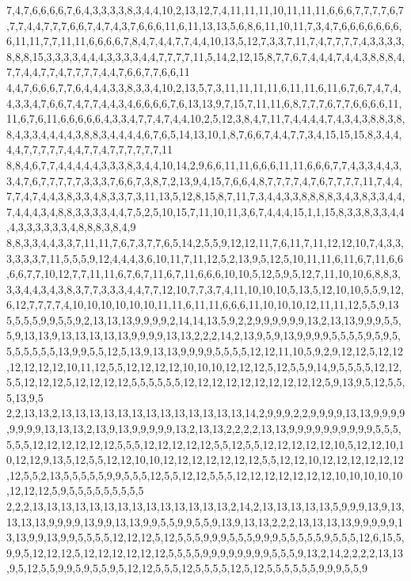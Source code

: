7,4,7,6,6,6,6,7,6,4,3,3,3,3,8,3,4,4,10,2,13,12,7,4,11,11,11,10,11,11,11,6,6,6,7,7,7,7,6,7,7,7,4,4,7,7,7,6,6,7,4,7,4,3,7,6,6,6,11,6,11,13,13,5,6,8,6,11,10,11,7,3,4,7,6,6,6,6,6,6,6,6,11,11,7,7,11,11,6,6,6,6,7,8,4,7,4,4,7,7,4,4,10,13,5,12,7,3,3,7,11,7,4,7,7,7,7,4,3,3,3,3,8,8,8,15,3,3,3,3,4,4,4,3,3,3,3,4,4,7,7,7,7,11,5,14,2,12,15,8,7,7,6,7,4,4,4,7,4,4,3,8,8,8,4,7,7,4,4,7,7,4,7,7,7,7,4,4,7,6,6,7,7,6,6,11
4,4,7,6,6,6,7,7,6,4,4,4,3,3,8,3,3,4,10,2,13,5,7,3,11,11,11,11,6,11,11,6,11,6,7,6,7,4,7,4,4,3,3,4,7,6,6,7,4,7,7,4,4,3,4,6,6,6,6,7,6,13,13,9,7,15,7,11,11,6,8,7,7,7,6,7,7,6,6,6,6,11,11,6,7,6,11,6,6,6,6,6,4,3,3,4,7,7,4,7,4,4,10,2,5,12,3,8,4,7,11,7,4,4,4,4,7,4,3,4,3,8,8,3,8,8,4,3,3,4,4,4,4,3,8,8,3,4,4,4,4,6,7,6,5,14,13,10,1,8,7,6,6,7,4,4,7,7,3,4,15,15,15,8,3,4,4,4,4,7,7,7,7,7,4,4,7,7,4,7,7,7,7,7,7,11
8,8,4,6,7,7,4,4,4,4,4,3,3,3,8,3,4,4,10,14,2,9,6,6,11,11,6,6,6,11,11,6,6,6,7,7,4,3,3,4,4,3,3,4,7,6,7,7,7,7,7,3,3,3,7,6,6,7,3,8,7,2,13,9,4,15,7,6,6,4,8,7,7,7,7,4,7,6,7,7,7,7,11,7,4,4,7,7,4,7,4,4,3,8,3,3,4,8,3,3,7,3,11,13,5,12,8,15,8,7,11,7,3,4,4,3,3,8,8,8,8,3,4,3,8,3,3,4,4,7,4,4,4,3,4,8,8,3,3,3,3,4,4,7,5,2,5,10,15,7,11,10,11,3,6,7,4,4,4,15,1,1,15,8,3,3,8,3,3,4,4,4,3,3,3,3,3,3,4,8,8,8,3,8,4,9
8,8,3,3,4,4,3,3,7,11,11,7,6,7,3,7,7,6,5,14,2,5,5,9,12,12,11,7,6,11,7,11,12,12,10,7,4,3,3,3,3,3,3,7,11,5,5,5,9,12,4,4,4,3,6,10,11,7,11,12,5,2,13,9,5,12,5,10,11,11,6,11,6,7,11,6,6,6,6,7,7,10,12,7,7,11,11,6,7,6,7,11,6,7,11,6,6,6,10,10,5,12,5,9,5,12,7,11,10,10,6,8,8,3,3,3,4,4,3,4,3,8,3,7,7,3,3,3,4,4,7,7,12,10,7,7,3,7,4,11,10,10,10,5,13,5,12,10,10,5,5,9,12,6,12,7,7,7,7,4,10,10,10,10,10,10,11,11,6,11,11,6,6,6,11,10,10,10,12,11,11,12,5,5,9,13
5,5,5,5,9,9,5,5,9,2,13,13,13,9,9,9,9,2,14,14,13,5,9,2,2,9,9,9,9,9,9,13,2,13,13,9,9,9,5,5,5,9,13,13,9,13,13,13,13,13,9,9,9,9,13,13,2,2,2,14,2,13,9,5,9,13,9,9,9,9,5,5,5,5,9,5,9,5,5,5,5,5,5,5,13,9,9,5,5,12,5,13,9,13,13,9,9,9,9,5,5,5,5,12,12,11,10,5,9,2,9,12,12,5,12,12,12,12,12,12,10,11,12,5,5,12,12,12,12,10,10,10,12,12,12,5,12,5,5,9,14,9,5,5,5,5,12,12,5,5,12,12,12,5,12,12,12,12,5,5,5,5,5,5,12,12,12,12,12,12,12,12,12,12,5,9,13,9,5,12,5,5,5,13,9,5
2,2,13,13,2,13,13,13,13,13,13,13,13,13,13,13,13,13,14,2,9,9,9,2,2,9,9,9,9,13,13,9,9,9,9,9,9,9,9,13,13,13,2,13,9,13,9,9,9,9,9,13,2,13,13,2,2,2,2,13,13,9,9,9,9,9,9,9,9,9,9,5,5,5,5,5,5,12,12,12,12,12,12,5,5,5,12,12,12,12,12,5,5,12,5,5,12,12,12,12,12,10,5,12,12,10,10,12,12,9,13,5,12,5,5,12,12,10,10,12,12,12,12,12,12,12,5,5,12,12,10,12,12,12,12,12,12,12,5,5,2,13,5,5,5,5,5,9,9,5,5,5,12,5,5,12,12,5,5,5,12,12,12,12,12,12,12,10,10,10,10,10,12,12,12,5,9,5,5,5,5,5,5,5,5,5
2,2,2,13,13,13,13,13,13,13,13,13,13,13,13,13,13,2,14,2,13,13,13,13,13,5,9,9,9,13,9,13,13,13,13,9,9,9,9,13,9,9,13,13,9,9,5,5,9,9,5,5,9,13,9,13,13,2,2,2,13,13,13,13,9,9,9,9,9,13,13,9,9,13,9,9,5,5,5,5,12,12,12,5,12,5,5,5,9,9,9,5,5,5,9,9,9,5,5,5,5,5,9,5,5,5,12,6,15,5,9,9,5,12,12,12,5,12,12,12,12,12,12,5,5,5,5,9,9,9,9,9,9,9,9,5,5,5,9,13,2,14,2,2,2,2,13,13,9,5,12,5,5,9,9,5,9,5,5,9,5,12,12,5,5,5,12,5,5,5,5,12,5,12,5,5,5,5,5,5,9,9,9,5,5,9
